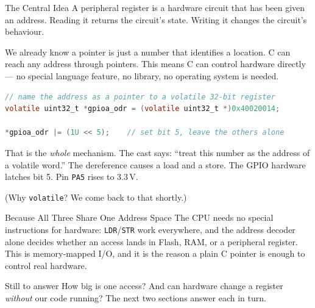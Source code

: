 \documentclass[9pt,aspectratio=169,xcolor=table]{beamer}
\begin{document}
\begin{frame}[fragile]{The Central Idea}
    \leavevmode
    {\small A peripheral register is a \alert{hardware circuit that has
    been given an address}. Reading it returns the circuit's state.
    Writing it changes the circuit's behaviour.}

    \vspace{2mm}
    {\small We already know a pointer is just a number that identifies a
    location. C can reach any address through pointers. This means
    \alert{C can control hardware directly} --- no special language
    feature, no library, no operating system is needed.}

    \vspace{2mm}
\begin{lstlisting}[language=C, basicstyle=\ttfamily\footnotesize]
// name the address as a pointer to a volatile 32-bit register
volatile uint32_t *gpioa_odr = (volatile uint32_t *)0x40020014;

*gpioa_odr |= (1U << 5);    // set bit 5, leave the others alone
\end{lstlisting}

    \vspace{1mm}
    {\small That is the \emph{whole} mechanism. The cast says: ``treat
    this number as the address of a volatile word.'' The dereference
    causes a load and a store. The GPIO hardware latches bit 5. Pin
    \texttt{PA5} rises to 3.3\,V.}

    \vspace{1mm}
    {\small (Why \texttt{volatile}? We come back to that shortly.)}
\end{frame}

\begin{frame}{Because All Three Share One Address Space}
    \leavevmode
    {\small The CPU needs no special instructions for hardware:
    \texttt{LDR}/\texttt{STR} work everywhere, and the address decoder
    alone decides whether an access lands in Flash, RAM, or a peripheral
    register. This is \alert{memory-mapped I/O}, and it is the reason a
    plain C pointer is enough to control real hardware.}

    \vspace{3mm}
    \begin{block}{Still to answer}
        How big is one access? And can hardware change a register
        \emph{without} our code running? The next two sections answer
        each in turn.
    \end{block}
\end{frame}
\end{document}
